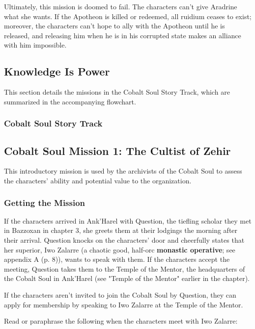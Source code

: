 \documentclass[letterpaper, 11pt, bg=full, twocolumn]{dndbook}
\begin{document}
Ultimately, this mission is doomed to fail. The characters can't give Aradrine what she wants. If the Apotheon is killed or redeemed, all ruidium ceases to exist; moreover, the characters can't hope to ally with the Apotheon until he is released, and releasing him when he is in his corrupted state makes an alliance with him impossible.

\subsection{Knowledge Is Power}

This section details the missions in the Cobalt Soul Story Track, which are summarized in the accompanying flowchart.

\subsubsection{Cobalt Soul Story Track}



\subsection{Cobalt Soul Mission 1: The Cultist of Zehir}

This introductory mission is used by the archivists of the Cobalt Soul to assess the characters' ability and potential value to the organization.

\subsubsection{Getting the Mission}

If the characters arrived in Ank'Harel with Question, the tiefling scholar they met in Bazzoxan in chapter 3, she greets them at their lodgings the morning after their arrival. Question knocks on the characters' door and cheerfully states that her superior, Iwo Zalarre (a chaotic good, half-orc \textbf{monastic operative}; see appendix A (p. 8)), wants to speak with them. If the characters accept the meeting, Question takes them to the Temple of the Mentor, the headquarters of the Cobalt Soul in Ank'Harel (see "Temple of the Mentor" earlier in the chapter).

If the characters aren't invited to join the Cobalt Soul by Question, they can apply for membership by speaking to Iwo Zalarre at the Temple of the Mentor.

Read or paraphrase the following when the characters meet with Iwo Zalarre:
\end{document}
